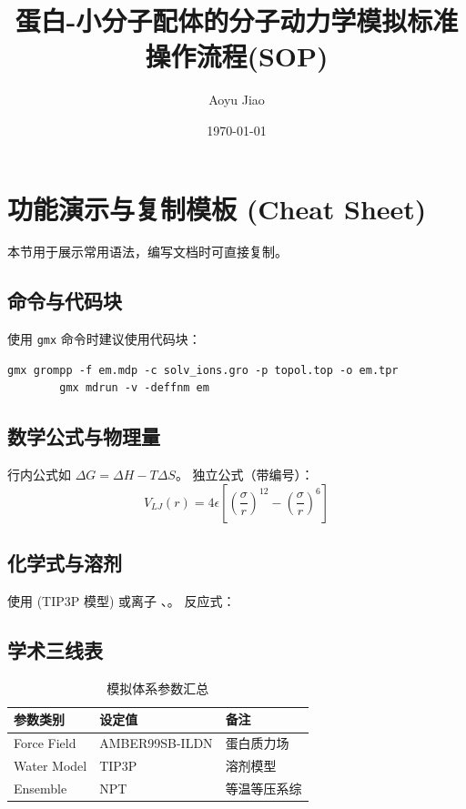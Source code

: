 \documentclass[UTF8, a4paper, 11pt]{ctexart}
\title{蛋白-小分子配体的分子动力学模拟标准操作流程(SOP)}
\author{Aoyu Jiao}
\date{\today}
\begin{document}
	
	\maketitle
	
	\tableofcontents
	\newpage
	
	\section{功能演示与复制模板 (Cheat Sheet)}
	\label{sec:cheatsheet}
	本节用于展示常用语法，编写文档时可直接复制。
	
	\subsection{命令与代码块}
	使用 \texttt{gmx} 命令时建议使用代码块：
	\begin{lstlisting}[caption=能量最小化命令示例]
		gmx grompp -f em.mdp -c solv_ions.gro -p topol.top -o em.tpr
		gmx mdrun -v -deffnm em
	\end{lstlisting}
	
	\subsection{数学公式与物理量}
	行内公式如 $\Delta G = \Delta H - T\Delta S$。
	独立公式（带编号）：
	\begin{equation}
		V_{LJ}(r) = 4\epsilon \left[ \left(\frac{\sigma}{r}\right)^{12} - \left(\frac{\sigma}{r}\right)^{6} \right]
		\label{eq:lennard_jones}
	\end{equation}
	
	\subsection{化学式与溶剂}
	使用  (TIP3P 模型) 或离子 、。
	反应式：
	
	\subsection{学术三线表}
	\begin{table}[h]
		\centering
		\caption{模拟体系参数汇总}
		\begin{tabular}{lll}
			\toprule
			参数类别 & 设定值 & 备注 \\
			\midrule
			Force Field & AMBER99SB-ILDN & 蛋白质力场 \\
			Water Model & TIP3P & 溶剂模型 \\
			Ensemble & NPT & 等温等压系综 \\
			\bottomrule
		\end{tabular}
	\end{table}
	
\end{document}
